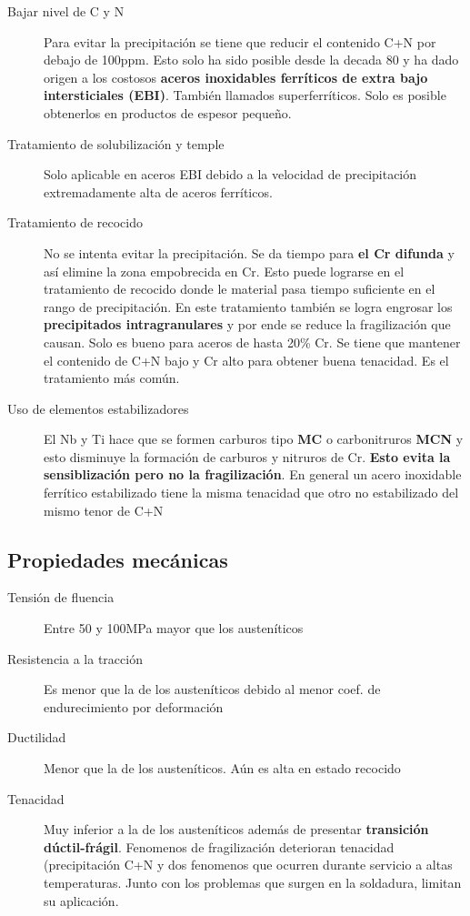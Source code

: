 \begin{description}
	\item[Bajar nivel de C y N]  Para evitar la precipitación se tiene que reducir el contenido C+N por debajo de 100ppm. Esto solo ha sido posible desde la decada 80 y ha dado origen a los costosos \textbf{aceros inoxidables ferríticos de extra bajo intersticiales (EBI)}. También llamados superferríticos. Solo es posible obtenerlos en productos de espesor pequeño.
	\item[Tratamiento de solubilización y temple] Solo aplicable en aceros EBI debido a la velocidad de precipitación extremadamente alta de aceros ferríticos.
	\item[Tratamiento de recocido] No se intenta evitar la precipitación. Se da tiempo para \textbf{el Cr difunda} y así elimine la zona empobrecida en Cr. Esto puede lograrse en el tratamiento de recocido donde le material pasa tiempo suficiente en el rango de precipitación. En este tratamiento también se logra engrosar los \textbf{precipitados intragranulares} y por ende se reduce la fragilización que causan. Solo es bueno para aceros de hasta 20\% Cr. Se tiene que mantener el contenido de C+N bajo y Cr alto para obtener buena tenacidad. Es el tratamiento más común.
	\item[Uso de elementos estabilizadores] El Nb y Ti hace que se formen carburos tipo \textbf{MC} o carbonitruros \textbf{MCN} y esto disminuye la formación de carburos y nitruros de Cr. \textbf{Esto evita la sensiblización pero no la fragilización}. En general un acero inoxidable ferrítico estabilizado tiene la misma tenacidad que otro no estabilizado del mismo tenor de C+N
\end{description}

\subsection{Propiedades mecánicas}

\begin{description}
	\item[Tensión de fluencia]  Entre 50 y 100MPa mayor que los austeníticos
	\item[Resistencia a la tracción] Es menor que la de los austeníticos debido al menor coef. de endurecimiento por deformación
	\item[Ductilidad] Menor que la de los austeníticos. Aún es alta en estado recocido
	\item[Tenacidad] Muy inferior a la de los austeníticos además de presentar \textbf{transición dúctil-frágil}. Fenomenos de fragilización deterioran tenacidad (precipitación C+N y dos fenomenos que ocurren durante servicio a altas temperaturas. Junto con los problemas que surgen en la soldadura, limitan su aplicación.
\end{description}


